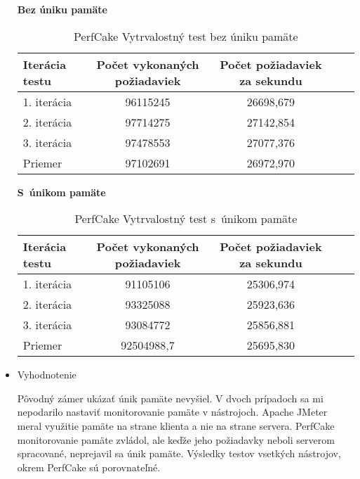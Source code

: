 \documentclass[12pt,oneside,final]{fithesis-utf8}
\begin{document}
\begin{itemize}
\textbf{Bez úniku pamäte}

\begin{table}[H]
\begin{center}
\begin{tabular}{ | l | c | c | c | c |}
		\hline
		 \textbf{Iterácia testu} & \textbf{Počet vykonaných požiadaviek} & \textbf{Počet požiadaviek za sekundu} \\ \hline
		 1. iterácia & 96115245 & 26698,679 \\ \hline
		 2. iterácia & 97714275 & 27142,854 \\ \hline
		 3. iterácia & 97478553 & 27077,376 \\ \hline
		 Priemer & 97102691 & 26972,970 \\ \hline
		 
\end{tabular}
\end{center}
\caption{PerfCake Vytrvalostný test bez úniku pamäte}
\end{table}

\textbf{S~únikom pamäte}

\begin{table}[H]
\begin{center}
\begin{tabular}{ | l | c | c | c | c |}
		\hline
		 \textbf{Iterácia testu} & \textbf{Počet vykonaných požiadaviek} & \textbf{Počet požiadaviek za sekundu} \\ \hline
		 1. iterácia & 91105106 & 25306,974 \\ \hline
		 2. iterácia & 93325088 & 25923,636 \\ \hline
		 3. iterácia & 93084772 & 25856,881 \\ \hline
		 Priemer & 92504988,7 & 25695,830 \\ \hline
		 
\end{tabular}
\end{center}
\caption{PerfCake Vytrvalostný test s~únikom pamäte}
\end{table}

\item Vyhodnotenie

Pôvodný zámer ukázať únik pamäte nevyšiel. V dvoch prípadoch sa mi nepodarilo nastaviť monitorovanie pamäte v nástrojoch. Apache JMeter meral využitie pamäte na strane klienta a nie na strane servera. PerfCake monitorovanie pamäte zvládol, ale keďže jeho požiadavky neboli serverom spracované, neprejavil sa únik pamäte. Výsledky testov vsetkých nástrojov, okrem PerfCake sú porovnateľné.



\end{itemize}
\end{document}
